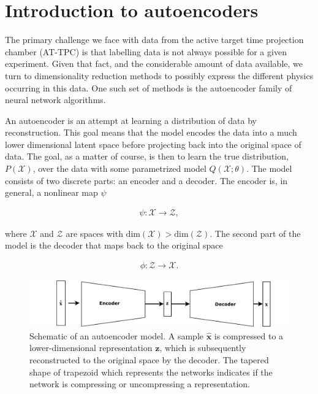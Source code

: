 

\section{Introduction to autoencoders}\label{sec:intro_autoenc}

The primary challenge we face with data from the active target time projection chamber (AT-TPC) is that labelling data is not always possible for a given experiment. Given that fact, and the considerable amount of data available, we turn to dimensionality reduction methods to possibly express the different physics occurring in this data. One such set of methods is the autoencoder family of neural network algorithms.

An autoencoder is an attempt at learning a distribution of data by reconstruction. This goal means that the model encodes the data into a much lower dimensional latent space before projecting back into the original space of data. The goal, as a matter of course, is then to learn the true distribution, $P(\mathcal{X})$, over the data with some parametrized model $Q(\mathcal{X};\theta)$. The model consists of two discrete parts: an encoder and a decoder. The encoder is, in general, a nonlinear map $\psi$

\begin{align}
  \psi: \mathcal{X} \rightarrow \mathcal{Z},
\end{align}

\noindent where $\mathcal{X} $ and $\mathcal{Z}$ are spaces with $\text{dim}(\mathcal{X}) > \text{dim}(\mathcal{Z})$.
The second part of the model is the decoder that maps back to the original space


\begin{align}
  \phi: \mathcal{Z} \rightarrow \mathcal{X}.
\end{align}

\begin{figure}[tb]
    \centering
    \includegraphics[width=\textwidth]{plots/autoencoder.pdf}
    \caption[Autoencoder schematic]{Schematic of an autoencoder model. A sample $\hat{\boldsymbol{x}}$ is compressed to a lower-dimensional representation $\boldsymbol{z}$, which is subsequently reconstructed to the original space by the decoder. The tapered shape of trapezoid which represents the networks indicates if the network is compressing or uncompressing a representation.}
    \label{fig:autoencoder}
\end{figure}

